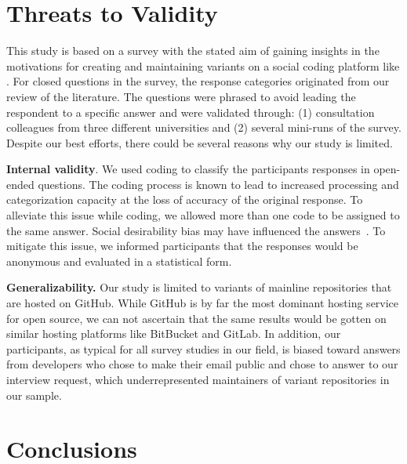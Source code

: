 \section{Threats to Validity}
This study is based on a survey with the stated aim of gaining insights
in the motivations for creating and maintaining variants on a social coding platform like \gh.
For closed questions in the survey, the response categories originated from our review of the literature.
The questions were phrased to avoid leading the respondent to a specific answer and were validated through: (1) consultation colleagues from three different universities and (2) several mini-runs of the survey. Despite our best efforts, there could be several reasons why our study is limited.

\noindent \textbf{Internal validity}. We used coding to classify the participants responses in open-ended questions. The coding process is known to lead to increased processing and categorization capacity at the loss of accuracy of the original response. To alleviate this issue while coding, we allowed more than one code to be assigned to the same answer. 
Social desirability bias may have influenced the answers~\cite{Furnham:1986}. To mitigate this issue, we informed participants that the responses would be anonymous and evaluated in a statistical form. %

\noindent \textbf{Generalizability.} Our study is limited to variants of mainline repositories that are hosted on GitHub. While GitHub is by far the most dominant hosting service for open source, we can not ascertain that the same results would be gotten on similar hosting platforms like \textsf{BitBucket} and \textsf{GitLab}.
In addition, our participants, as typical for all survey studies in our field, is biased toward answers from developers who chose to make their email public and chose to answer to our interview request, which underrepresented maintainers of variant repositories in our sample.

\section{Conclusions}


